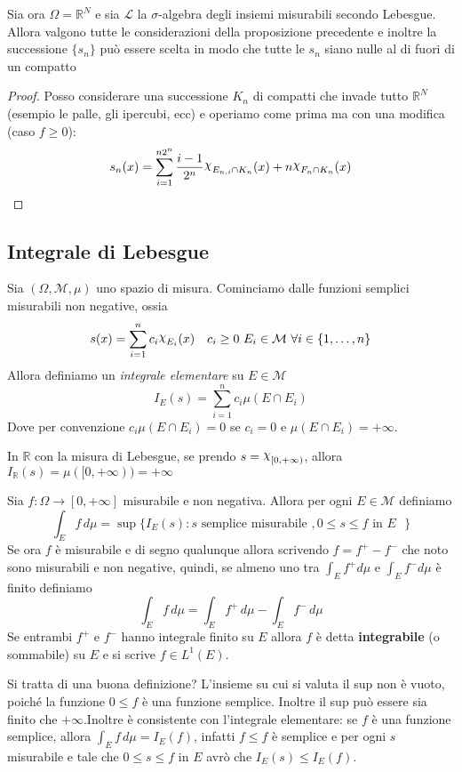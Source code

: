 \begin{lemmao}\label{le:nulle_fuori_compatti}
Sia ora \(\Omega = \mathbb{R}^{N}\) e sia \(\mathcal{L}\) la \(\sigma\)-algebra
degli insiemi misurabili secondo Lebesgue. Allora valgono tutte le
considerazioni della proposizione precedente e inoltre la successione
\(\{s_{n}\} \) può essere scelta in modo che tutte le \(s_{n}\) siano nulle al
di fuori di un compatto 
\end{lemmao}
\begin{proof}
    Posso considerare una successione \(K_{n}\) di compatti che invade tutto
    \(\mathbb{R}^{N}\) (esempio le palle, gli ipercubi, ecc) e operiamo come
    prima ma con una modifica (caso \(f \ge 0\)):
    \[
        s_{n}(x) = \sum_{i=1}^{n{2}^{n}} \frac{i-1}{2^{n}} \rchi_{E_{n, i} \cap
        K_{n}}(x) +
        n \rchi_{F_{n} \cap K_{n}}(x)
    \]
\end{proof}

\subsection{Integrale di Lebesgue}
Sia \((\Omega, \mathcal{M}, \mu)\) uno spazio di misura. Cominciamo dalle
funzioni semplici misurabili non negative, ossia
\[
    s(x) = \sum_{i=1}^{n} c_{i} \rchi_{E_{i}}(x) \quad c_{i} \ge 0 \,\,
    E_{i} \in \mathcal{M} \,\, \forall i \in \{1, \dots, n\}
\]
Allora definiamo un \emph{integrale elementare} su \(E \in \mathcal{M}\) 
\[
    I_E(s) = \sum_{i=1}^{n} c_{i} \mu(E \cap E_{i})
\]
Dove per convenzione \(c_{i}\mu(E \cap E_{i}) = 0\) se \(c_{i} = 0\) e \(\mu(E
\cap E_{i}) = +\infty\). 
\begin{example}
    In \(\mathbb{R}\) con la misura di Lebesgue, se prendo \(s = \rchi_{[0,
    +\infty)}\), allora \(I_{\mathbb{R}}(s) = \mu([0, +\infty)) = +\infty \) 
\end{example}
\begin{definition}
    Sia \(f: \Omega \to [0, +\infty]\) misurabile e non negativa. Allora per
    ogni \(E \in \mathcal{M}\) definiamo 
    \[
        \int_E f \, d\mu = \sup \{I_{E}(s) : s \text{ semplice misurabile }, 0 \le s \le f
        \text{ in \(E\) }\}
    \]
Se ora \(f\) è misurabile e di segno qualunque allora scrivendo \(f = f^{+} -
f^{-}\) che noto sono misurabili e non negative, quindi, se almeno uno tra
\(\int_E f^{+} d\mu\) e \(\int_E f^{-} d\mu\) è finito definiamo
\[
    \int_{E} f \, d\mu = \int_{E} f^{+} \, d\mu - \int_{E} f^{-} \, d\mu
\]
Se entrambi \(f^{+}\) e \(f^{-}\) hanno integrale finito su \(E\) allora \(f\) 
è detta \textbf{integrabile} (o sommabile) su \(E\) e si scrive \(f \in L^{1}(E)\). 
\end{definition}
Si tratta di una buona definizione? L'insieme su cui si valuta il sup non è vuoto, poiché la funzione \(0 \le f\) è una funzione
semplice. Inoltre il sup può essere sia finito che \(+\infty\).Inoltre è consistente con l'integrale elementare: se \(f\) è una
funzione semplice, allora \(\int_{E} f \, d\mu = I_{E}(f)\), infatti \(f \le f\)
è semplice e per ogni \(s\) misurabile e tale che \(0 \le s\le f\) in \(E\) avrò
che \(I_E(s) \le I_E(f)\).

